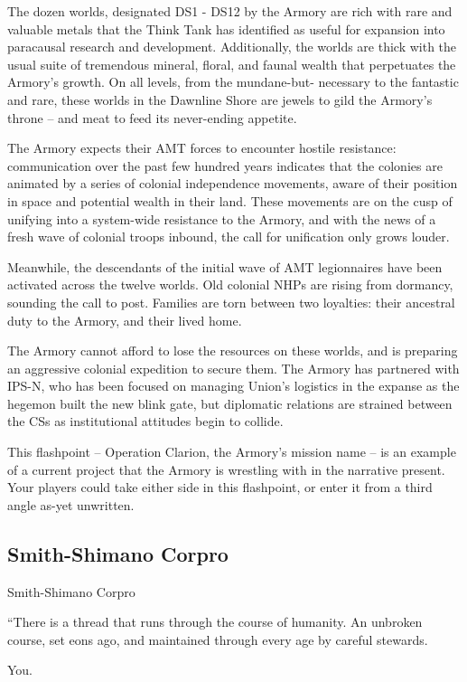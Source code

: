 The dozen worlds, designated DS1 - DS12 by the Armory are rich with rare and valuable metals
that the Think Tank has identified as useful for expansion into paracausal research and
development. Additionally, the worlds are thick with the usual suite of tremendous mineral, floral,
and faunal wealth that perpetuates the Armory’s growth. On all levels, from the mundane-but-
necessary to the fantastic and rare, these worlds in the Dawnline Shore are jewels to gild the
Armory’s throne -- and meat to feed its never-ending appetite.


The Armory expects their AMT forces to encounter hostile resistance: communication over the
past few hundred years indicates that the colonies are animated by a series of colonial
independence movements, aware of their position in space and potential wealth in their land.
These movements are on the cusp of unifying into a system-wide resistance to the Armory, and
with the news of a fresh wave of colonial troops inbound, the call for unification only grows
louder.


Meanwhile, the descendants of the initial wave of AMT legionnaires have been activated across
the twelve worlds. Old colonial NHPs are rising from dormancy, sounding the call to post.
Families are torn between two loyalties: their ancestral duty to the Armory, and their lived home.


The Armory cannot afford to lose the resources on these worlds, and is preparing an aggressive
colonial expedition to secure them. The Armory has partnered with IPS-N, who has been focused
on managing Union’s logistics in the expanse as the hegemon built the new blink gate, but
diplomatic relations are strained between the CSs as institutional attitudes begin to collide.


This flashpoint -- Operation Clarion, the Armory’s mission name -- is an example of a current
project that the Armory is wrestling with in the narrative present. Your players could take either
side in this flashpoint, or enter it from a third angle as-yet unwritten.

\subsection{Smith-Shimano Corpro}
Smith-Shimano Corpro

         “There is a thread that runs through the course of humanity. An unbroken course,
         set eons ago, and maintained through every age by careful stewards.

         You.


